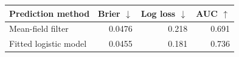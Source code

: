 \begin{tabular}{lrrr}\toprule
Prediction method & Brier $\downarrow$ & Log loss $\downarrow$ & AUC $\uparrow$\\\midrule
Mean-field filter & 0.0476 & 0.218 & 0.691\\
Fitted logistic model & 0.0455 & 0.181 & 0.736\\
\bottomrule\end{tabular}
